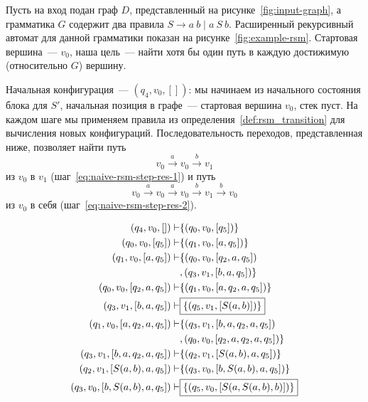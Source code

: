 \begin{example}
Пусть на вход подан граф $D$, представленный на рисунке~\ref{fig:input-graph}, а грамматика $G$ содержит два правила $S \to a \ b \mid a \ S \ b$.
Расширенный рекурсивный автомат для данной грамматики показан на рисунке~\ref{fig:example-rsm}. 
Стартовая вершина~--- $v_0$, наша цель~--- найти хотя бы один путь в каждую достижимую (относительно $G$) вершину. 

Начальная конфигурация~--- $(q_4,v_0,[])$: мы начинаем из начального состояния блока для $S'$, начальная позиция в графе~--- стартовая вершина $v_0$, стек пуст. На каждом шаге мы применяем правила из определения~\ref{def:rsm_transition} для вычисления новых конфигураций. Последовательность переходов, представленная ниже, позволяет найти путь $$v_0 \xrightarrow{a} v_0 \xrightarrow{b} v_1$$
из $v_0$ в $v_1$ (шаг~\ref{eq:naive-rsm-step-res-1}) и путь
$$v_0 \xrightarrow{a} v_0 \xrightarrow{a} v_0 \xrightarrow{b} v_1 \xrightarrow{b} v_0$$
из $v_0$ в себя (шаг~\ref{eq:naive-rsm-step-res-2}).

\begin{align}
    \setcounter{equation}{0}
    (q_4,v_0,[])     \vdash           & \{(q_0,v_0,[q_5])\}                                                   \\
    (q_0,v_0,[q_5])  \vdash           & \{(q_1,v_0,[a,q_5])\}                                                 \\
    (q_1,v_0,[a,q_5])\vdash           & \{(q_0,v_0,[q_2,a,q_5]) \nonumber                                     \\
                                      & , (q_3,v_1,[b,a,q_5])\}                                               \\
    (q_0,v_0,[q_2,a,q_5]) \vdash      & \{(q_1,v_0,[a,q_2,a,q_5])\}                                           \\
    (q_3,v_1,[b,a,q_5])   \vdash      & \boxed{\{(q_5,v_1,[S(a,b)])\}} \label{eq:naive-rsm-step-res-1}        \\
    (q_1,v_0,[a,q_2,a,q_5]) \vdash    & \{(q_3,v_1,[b,a,q_2,a,q_5]) \nonumber                                 \\
                                      & , (q_0,v_0,[q_2,a,q_2,a,q_5])\} \label{eq:naive-rsm-step-6}           \\
    (q_3,v_1,[b,a,q_2,a,q_5]) \vdash  & \{(q_2,v_1,[S(a,b),a,q_5])\}                                          \\
    (q_2,v_1,[S(a,b),a,q_5]) \vdash   & \{(q_3,v_0,[b,S(a,b),a,q_5])\}                                        \\
    (q_3,v_0,[b,S(a,b),a,q_5]) \vdash & \boxed{\{(q_5,v_0,[S(a,S(a,b),b)])\}} \label{eq:naive-rsm-step-res-2}
\end{align}


\end{example}
